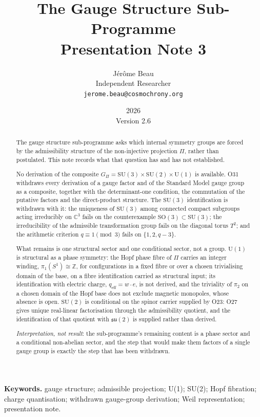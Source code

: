 \documentclass[11pt,a4paper]{article}
\title{The Gauge Structure Sub-Programme\\[0.4em]
\large Presentation Note 3}
\author{J\'{e}r\^{o}me Beau\\[0.3em]
\small Independent Researcher\\
\small \texttt{jerome.beau@cosmochrony.org}}
\date{2026\\[2pt]\small Version 2.6}
\theoremstyle{definition}
\newcommand{\SU}{\mathrm{SU}}
\newcommand{\SO}{\mathrm{SO}}
\newcommand{\su}{\mathfrak{su}}
\newcommand{\UU}{\mathrm{U}}
\newcommand{\Gpi}{G_{\Pi}}
\begin{document}
  \maketitle

  \begin{abstract}
    The gauge structure sub-programme asks which internal symmetry groups are forced by the
    admissibility structure of the non-injective projection $\Pi$, rather than postulated.
    This note records what that question has and has not established.

    No derivation of the composite $\Gpi = \SU(3) \times \SU(2) \times \UU(1)$ is available.
    O31 withdraws every derivation of a gauge factor and of the Standard Model
    gauge group as a composite, together with the determinant-one condition, the commutation of the
    putative factors and the direct-product structure.
    The $\SU(3)$ identification is withdrawn with it: the uniqueness of $\SU(3)$ among connected
    compact subgroups acting irreducibly on $\mathbb{C}^3$ fails on the counterexample
    $\SO(3) \subset \SU(3)$; the irreducibility of the admissible transformation group fails on the
    diagonal torus $T^2$; and the arithmetic criterion $q \equiv 1 \pmod 3$ fails on
    $\{1, 2, q-3\}$.

    What remains is one structural sector and one conditional sector, not a group.
    $\UU(1)$ is structural as a phase symmetry: the Hopf phase fibre of $\Pi$ carries an integer
    winding, $\pi_1(S^1) \cong \mathbb{Z}$, for configurations in a fixed fibre or over a chosen
    trivialising domain of the base, on a fibre identification carried as structural input; its
    identification with electric charge, $q_{\mathrm{eff}} = w \cdot e$, is not derived, and the
    triviality of $\pi_2$ on a chosen domain of the Hopf base does not exclude magnetic monopoles,
    whose absence is open.
    $\SU(2)$ is conditional on the spinor carrier supplied by O23: O27 gives
    unique real-linear factorisation through the admissibility quotient, and the identification of
    that quotient with $\su(2)$ is supplied rather than derived.

    \emph{Interpretation, not result}: the sub-programme's remaining content is a phase sector and a
    conditional non-abelian sector, and the step that would make them factors of a single gauge
    group is exactly the step that has been withdrawn.
  \end{abstract}

  \medskip
  \noindent\textbf{Keywords.}
  gauge structure; admissible projection; U(1); SU(2); Hopf fibration; charge quantisation;
  withdrawn gauge-group derivation; Weil representation; presentation note.
\end{document}
